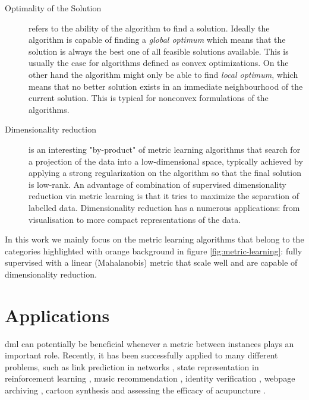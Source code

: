 \documentclass[12pt,a4paper]{report}
\begin{document}
\begin{description}
\item [Optimality of the Solution] refers to the ability of the algorithm to find a solution. Ideally the algorithm is capable of finding a \textit{global optimum} which means that the solution is always the best one of all feasible solutions available. This is usually the case for algorithms defined as convex optimizations. On the other hand the algorithm might only be able to find \textit{local optimum}, which means that no better solution exists in an immediate neighbourhood of the current solution. This is typical for nonconvex formulations of the algorithms.

\item [Dimensionality reduction] is an interesting "by-product" of metric learning algorithms that search for a projection of the data into a low-dimensional space, typically achieved by applying a strong regularization on the algorithm so that the final solution is low-rank. An advantage of combination of supervised dimensionality reduction via metric learning is that it tries to maximize the separation of labelled data. Dimensionality reduction has a numerous applications: from visualisation to more compact representations of the data.
\end{description}

In this work we mainly focus on the metric learning algorithms that belong to the categories highlighted with orange background in figure \ref{fig:metric-learning}: fully supervised with a linear (Mahalanobis) metric that scale well and are capable of dimensionality reduction. 

\section{Applications} \label{chap:intro:applications}

\acl{dml} can potentially be beneficial whenever a metric
between instances plays an important role. Recently, it has been successfully applied to many different problems, such as link prediction in networks \citep{shaw2011learning}, state representation in reinforcement learning \citep{taylor2011metric}, music recommendation \citep{mcfee2012learning}, identity verification \citep{ben2012improved}, webpage archiving \citep{law2012structural}, cartoon synthesis \citep{yu2012semisupervised} and assessing the efficacy of acupuncture \citep{liang2012learning}.
\end{document}
